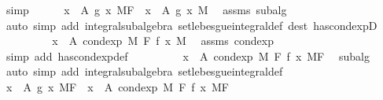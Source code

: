 \begin{isabellebody}
\ simp\isanewline
\ \ \ \ \isamarkupfalse%
\ {\isachardoublequoteopen}{\isacharparenleft}{\kern0pt}{\isasymintegral}x\ {\isasymin}\ A{\isachardot}{\kern0pt}\ g\ x\ {\isasympartial}{\isacharquery}{\kern0pt}MF{\isacharparenright}{\kern0pt}\ {\isacharequal}{\kern0pt}\ {\isacharparenleft}{\kern0pt}{\isasymintegral}x\ {\isasymin}\ A{\isachardot}{\kern0pt}\ g\ x\ {\isasympartial}M{\isacharparenright}{\kern0pt}{\isachardoublequoteclose}\ \isamarkupfalse%
\ assms\ subalg\ \isamarkupfalse%
\ {\isacharparenleft}{\kern0pt}auto\ simp\ add{\isacharcolon}{\kern0pt}\ integral{\isacharunderscore}{\kern0pt}subalgebra{}\ set{\isacharunderscore}{\kern0pt}lebesgue{\isacharunderscore}{\kern0pt}integral{\isacharunderscore}{\kern0pt}def\ dest{\isacharbang}{\kern0pt}{\isacharcolon}{\kern0pt}\ has{\isacharunderscore}{\kern0pt}cond{\isacharunderscore}{\kern0pt}expD{\isacharparenright}{\kern0pt}\isanewline
\ \ \ \ \isamarkupfalse%
\ \isamarkupfalse%
\ {\isachardoublequoteopen}{\isachardot}{\kern0pt}{\isachardot}{\kern0pt}{\isachardot}{\kern0pt}\ {\isacharequal}{\kern0pt}\ {\isacharparenleft}{\kern0pt}{\isasymintegral}x\ {\isasymin}\ A{\isachardot}{\kern0pt}\ cond{\isacharunderscore}{\kern0pt}exp\ M\ F\ f\ x\ {\isasympartial}M{\isacharparenright}{\kern0pt}{\isachardoublequoteclose}\ \isamarkupfalse%
\ assms\ cond{\isacharunderscore}{\kern0pt}exp\ \isamarkupfalse%
\ {\isacharparenleft}{\kern0pt}simp\ add{\isacharcolon}{\kern0pt}\ has{\isacharunderscore}{\kern0pt}cond{\isacharunderscore}{\kern0pt}exp{\isacharunderscore}{\kern0pt}def{\isacharparenright}{\kern0pt}\isanewline
\ \ \ \ \isamarkupfalse%
\ \isamarkupfalse%
\ {\isachardoublequoteopen}{\isachardot}{\kern0pt}{\isachardot}{\kern0pt}{\isachardot}{\kern0pt}\ {\isacharequal}{\kern0pt}\ {\isacharparenleft}{\kern0pt}{\isasymintegral}x\ {\isasymin}\ A{\isachardot}{\kern0pt}\ cond{\isacharunderscore}{\kern0pt}exp\ M\ F\ f\ x\ {\isasympartial}{\isacharquery}{\kern0pt}MF{\isacharparenright}{\kern0pt}{\isachardoublequoteclose}\ \isamarkupfalse%
\ subalg\ \isamarkupfalse%
\ {\isacharparenleft}{\kern0pt}auto\ simp\ add{\isacharcolon}{\kern0pt}\ integral{\isacharunderscore}{\kern0pt}subalgebra{}\ set{\isacharunderscore}{\kern0pt}lebesgue{\isacharunderscore}{\kern0pt}integral{\isacharunderscore}{\kern0pt}def{\isacharparenright}{\kern0pt}\isanewline
\ \ \ \ \isamarkupfalse%
\ \isamarkupfalse%
\ {\isachardoublequoteopen}{\isacharparenleft}{\kern0pt}{\isasymintegral}x\ {\isasymin}\ A{\isachardot}{\kern0pt}\ g\ x\ {\isasympartial}{\isacharquery}{\kern0pt}MF{\isacharparenright}{\kern0pt}\ {\isacharequal}{\kern0pt}\ {\isacharparenleft}{\kern0pt}{\isasymintegral}x\ {\isasymin}\ A{\isachardot}{\kern0pt}\ cond{\isacharunderscore}{\kern0pt}exp\ M\ F\ f\ x\ {\isasympartial}{\isacharquery}{\kern0pt}MF{\isacharparenright}{\kern0pt}{\isachardoublequoteclose}\ \isamarkupfalse%

\end{isabellebody}
